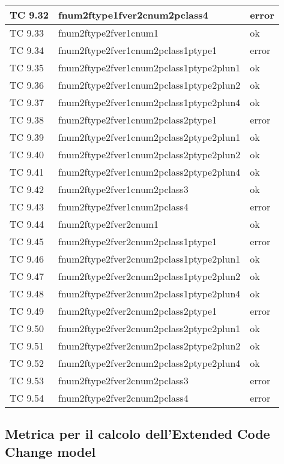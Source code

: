 \begin{longtable}{|p{3cm}|p{7cm}|p{3cm}|}
	\hline
	TC 9.32			& fnum2ftype1fver2cnum2pclass4			& error \tabularnewline
	\hline
	TC 9.33			& fnum2ftype2fver1cnum1				& ok \tabularnewline
	\hline
	TC 9.34			& fnum2ftype2fver1cnum2pclass1ptype1		& error \tabularnewline
	\hline
	TC 9.35			& fnum2ftype2fver1cnum2pclass1ptype2plun1	& ok \tabularnewline
	\hline
	TC 9.36			& fnum2ftype2fver1cnum2pclass1ptype2plun2	& ok \tabularnewline
	\hline
	TC 9.37			& fnum2ftype2fver1cnum2pclass1ptype2plun4	& ok \tabularnewline
	\hline
	TC 9.38			& fnum2ftype2fver1cnum2pclass2ptype1		& error \tabularnewline
	\hline
	TC 9.39			& fnum2ftype2fver1cnum2pclass2ptype2plun1	& ok \tabularnewline
	\hline
	TC 9.40			& fnum2ftype2fver1cnum2pclass2ptype2plun2	& ok \tabularnewline
	\hline
	TC 9.41			& fnum2ftype2fver1cnum2pclass2ptype2plun4	& ok \tabularnewline
	\hline
	TC 9.42			& fnum2ftype2fver1cnum2pclass3			& ok \tabularnewline
	\hline
	TC 9.43			& fnum2ftype2fver1cnum2pclass4			& error \tabularnewline
	\hline
	TC 9.44			& fnum2ftype2fver2cnum1				& ok \tabularnewline
	\hline
	TC 9.45			& fnum2ftype2fver2cnum2pclass1ptype1		& error \tabularnewline
	\hline
	TC 9.46			& fnum2ftype2fver2cnum2pclass1ptype2plun1	& ok \tabularnewline
	\hline
	TC 9.47			& fnum2ftype2fver2cnum2pclass1ptype2plun2	& ok \tabularnewline
	\hline
	TC 9.48			& fnum2ftype2fver2cnum2pclass1ptype2plun4	& ok \tabularnewline
	\hline
	TC 9.49			& fnum2ftype2fver2cnum2pclass2ptype1		& error \tabularnewline
	\hline
	TC 9.50			& fnum2ftype2fver2cnum2pclass2ptype2plun1	& ok \tabularnewline
	\hline
	TC 9.51			& fnum2ftype2fver2cnum2pclass2ptype2plun2	& ok \tabularnewline
	\hline
	TC 9.52			& fnum2ftype2fver2cnum2pclass2ptype2plun4	& ok \tabularnewline
	\hline
	TC 9.53			& fnum2ftype2fver2cnum2pclass3			& error \tabularnewline
	\hline
	TC 9.54			& fnum2ftype2fver2cnum2pclass4			& error \tabularnewline
	\hline
\end{longtable}
\clearpage



\subsection{Metrica per il calcolo dell'Extended Code Change model}

